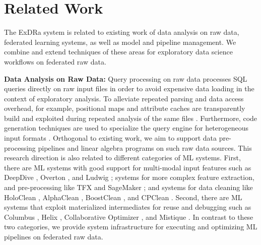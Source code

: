 \documentclass[sigconf,screen]{acmart}
\begin{document}
\section{Related Work}
\label{sec:relatedwork}

The ExDRa system is related to existing work of data analysis on raw data, federated learning systems, as well as model and pipeline management. We combine and extend techniques of these areas for exploratory data science workflows on federated raw data.

\textbf{Data Analysis on Raw Data:} Query processing on raw data \cite{AlagiannisBBIA12,IdreosAJA11} processes SQL queries directly on raw input files in order to avoid expensive data loading in the context of exploratory analysis. To alleviate repeated parsing and data access overhead, for example, positional maps and attribute caches are transparently build and exploited during repeated analysis of the same files \cite{AlagiannisBBIA12}. Furthermore, code generation techniques are used to specialize the query engine for heterogeneous input formats \cite{KarpathiotakisA16}. Orthogonal to existing work, we aim to support data pre-processing pipelines and linear algebra programs on such raw data sources. This research direction is also related to different categories of ML systems. First, there are ML systems with good support for multi-modal input features such as DeepDive \cite{ShinWWSZR15}, Overton \cite{Re20}, and Ludwig \cite{abs-1909-07930}; systems for more complex feature extraction, and pre-processing like TFX \cite{BaylorBCFFHHIJK17} and SageMaker \cite{DasIBRGKDRPSWZS20}; and systems for data cleaning like HoloClean \cite{RekatsinasCIR17,HeidariMIR19}, AlphaClean \cite{abs-1904-11827}, BoostClean \cite{abs-1711-01299}, and CPClean \cite{cpclean}. Second, there are ML systems that exploit materialized intermediates for reuse and debugging such as Columbus \cite{ZhangKR14}, Helix \cite{XinMLMSP18}, Collaborative Optimizer \cite{DerakhshanMARM20}, and Mistique \cite{VartakTMZ18}. In contrast to these two categories, we provide system infrastructure for executing and optimizing ML pipelines on federated raw data.
 
\end{document}
